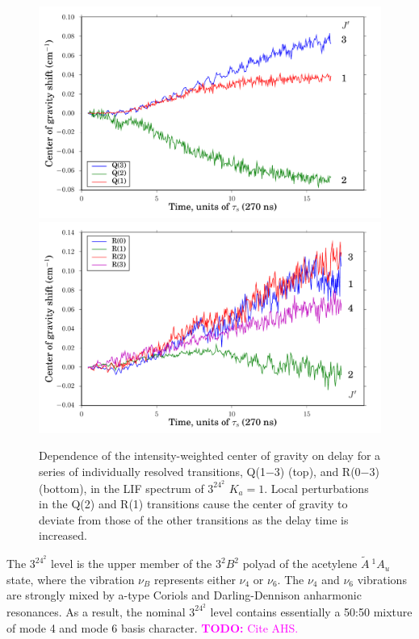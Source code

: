 \documentclass[12pt]{mitthesis}
\newcommand{\TODO} [1]{\textcolor{magenta}{\textbf{TODO:} #1}}
\newcommand{\astate}{$
  \tilde{A} \: ^1\!A_u
  $}
\newcommand{\Ka}[1]{$K_a\!\!=\!#1$}
\begin{document}
\begin{figure}
  \caption{Dependence of the intensity-weighted center of gravity on
    delay for a series of individually resolved transitions, Q(1$-$3)
    (top), and R(0$-$3) (bottom), in the LIF spectrum of $3^24^2$
    \Ka{1}.  Local perturbations in the Q(2) and R(1) transitions
    cause the center of gravity to deviate from those of the other
    transitions as the delay time is increased.}
  \label{fig:32b2-cog-delay}
  \centering
  \vspace{5mm}
  \includegraphics[width=6in]{32b2-q123-cog-delay.pdf}
  \includegraphics[width=6in]{32b2-r0123-cog-delay.pdf}
\end{figure}



The $3^24^2$ level is the upper member of the $3^2B^2$ polyad of the
acetylene \astate state, where the vibration $\nu_B$ represents either
$\nu_4$ or $\nu_6$.  The $\nu_4$ and $\nu_6$ vibrations are strongly
mixed by a-type Coriols and Darling-Dennison anharmonic resonances.
As a result, the nominal $3^24^2$ level contains essentially a 50:50
mixture of mode 4 and mode 6 basis character.  \TODO{Cite AHS.}
\end{document}

